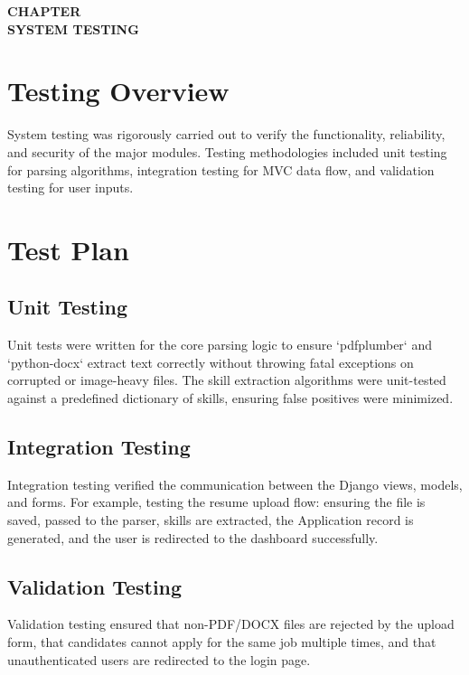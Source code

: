 \documentclass[12pt,a4paper]{report}
\newcommand{\chaptertitlepage}[1]{%
\cleardoublepage
\thispagestyle{empty}
\null
\vfill
\begin{center}
{\fontsize{16pt}{18pt}\selectfont\bfseries
CHAPTER \thechapter}\\[0.5cm]
{\fontsize{16pt}{18pt}\selectfont\bfseries
#1}
\end{center}
\vfill
\null
\clearpage
}
\begin{document}
\chaptertitlepage{SYSTEM TESTING}
\section{Testing Overview}
System testing was rigorously carried out to verify the functionality, reliability, and security of the major modules. Testing methodologies included unit testing for parsing algorithms, integration testing for MVC data flow, and validation testing for user inputs.

\section{Test Plan}
\subsection{Unit Testing}
Unit tests were written for the core parsing logic to ensure `pdfplumber` and `python-docx` extract text correctly without throwing fatal exceptions on corrupted or image-heavy files. The skill extraction algorithms were unit-tested against a predefined dictionary of skills, ensuring false positives were minimized.
\subsection{Integration Testing}
Integration testing verified the communication between the Django views, models, and forms. For example, testing the resume upload flow: ensuring the file is saved, passed to the parser, skills are extracted, the Application record is generated, and the user is redirected to the dashboard successfully.
\subsection{Validation Testing}
Validation testing ensured that non-PDF/DOCX files are rejected by the upload form, that candidates cannot apply for the same job multiple times, and that unauthenticated users are redirected to the login page.
\end{document}
